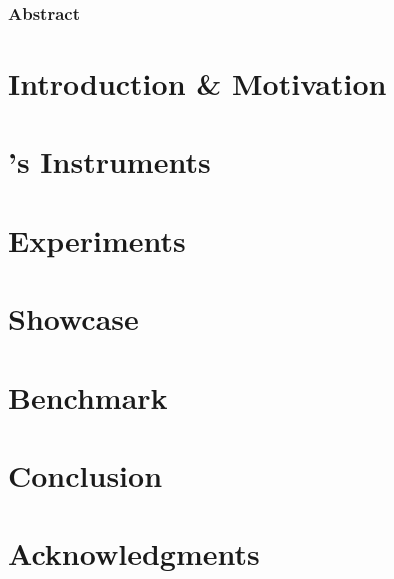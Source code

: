 \subsubsection{Abstract}
\Blindtext


\section{Introduction \& Motivation}\label{paper-2::sec:intro}

\section{\cockpittitle's Instruments}\label{paper-2::sec:instruments}

\section{Experiments}\label{paper-2::sec:experiments}

\section{Showcase}\label{paper-2::sec:showcase}

\section{Benchmark}\label{paper-2::sec:benchmark}

\section{Conclusion}\label{paper-2::sec:conclusion}

\section*{Acknowledgments}
\blindtext

